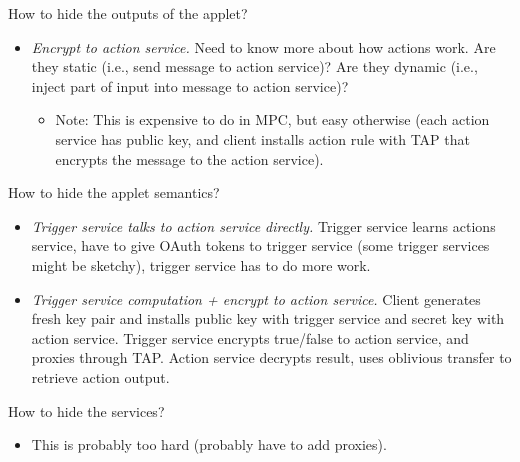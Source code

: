 How to hide the outputs of the applet?
\begin{itemize}[leftmargin=*]
  \item \emph{Encrypt to action service.} Need to know more about how actions
    work. Are they static (i.e., send message to action service)? Are they
    dynamic (i.e., inject part of input into message to action service)?
    \begin{itemize}
      \item Note: This is expensive to do in MPC, but easy otherwise (each
        action service has public key, and client installs action rule with TAP
        that encrypts the message to the action service).
    \end{itemize}
\end{itemize}\bigskip

How to hide the applet semantics?
\begin{itemize}[leftmargin=*]
  \item \emph{Trigger service talks to action service directly.} Trigger service
    learns actions service, have to give OAuth tokens to trigger service (some
    trigger services might be sketchy), trigger service has to do more work.
  \item \emph{Trigger service computation + encrypt to action service.}  Client
    generates fresh key pair and installs public key with trigger service and
    secret key with action service. Trigger service encrypts true/false to
    action service, and proxies through TAP. Action service decrypts result,
    uses oblivious transfer to retrieve action output.
\end{itemize}\bigskip

How to hide the services?
\begin{itemize}[leftmargin=*]
  \item This is probably too hard (probably have to add proxies).
\end{itemize}\bigskip

